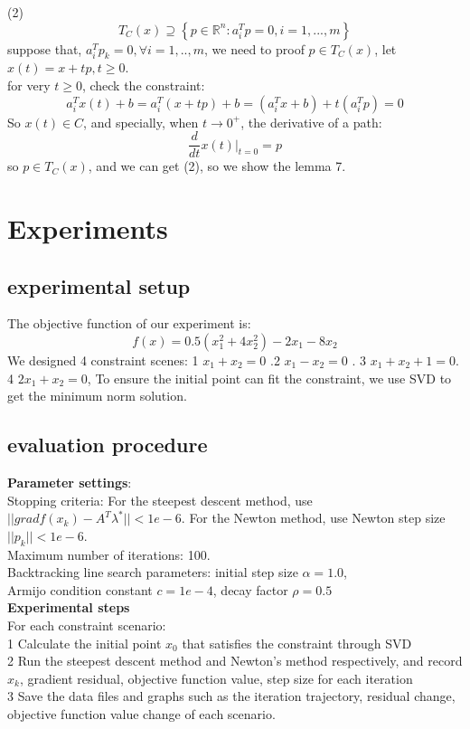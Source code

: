 \documentclass[12pt]{article}
\begin{document}
(2)
\[
T_C(x) \supseteq \left\{p\in \mathbb{R}^n : a_i^T p = 0, i = 1, ..., m\right\}
\]
suppose that, $a_i^Tp_k = 0, \forall i = 1, .. , m$, we need to proof $p \in T_C(x)$, let $x(t) = x + tp, t\geq 0$.\\
for very $t \geq 0$, check the constraint:
\[
a_i^Tx(t) + b = a^T_i(x + tp) + b = (a^T_i x + b) + t(a_i^Tp) = 0
\]
So $x(t) \in C$, and specially, when $t \rightarrow 0^+$, the derivative of a path:
\[
\frac{d}{dt} x(t) |_{t = 0} = p
\]
so $p \in T_C(x)$, and we can get (2), so we show the lemma 7. 
\section{Experiments}

\subsection{experimental setup}
The objective function of our experiment is: 
\[
f(x) = 0.5(x^2_1 + 4x^2_2) - 2x_1 - 8x_2
\]
We designed 4 constraint scenes: 1 $x_1 + x_2 = 0 $ .2 $x_1 - x_2 = 0 $ . 3 $x_1 + x_2 + 1= 0 $. 4 $2x_1 + x_2 = 0 $, To ensure the initial point can fit the constraint, we use SVD to get the minimum norm solution.
\subsection{evaluation procedure}
\textbf{Parameter settings}:\\
Stopping criteria: For the steepest descent method, use $||grad f(x_k) - A^T \lambda^* ||< 1e-6$. For the Newton method, use Newton step size $||p_k|| < 1e-6$.\\
Maximum number of iterations: 100.\\
Backtracking line search parameters: initial step size $\alpha = 1.0$, \\Armijo condition constant $c = 1e-4$, decay factor $\rho = 0.5$\\
\textbf{Experimental steps}\\
For each constraint scenario: \\
1 Calculate the initial point $x_0$ that satisfies the constraint through SVD\\
2 Run the steepest descent method and Newton's method respectively, and record $x_k$, gradient residual, objective function value, step size for each iteration\\
3 Save the data files and graphs such as the iteration trajectory, residual change, objective function value change of each scenario.
\end{document}
